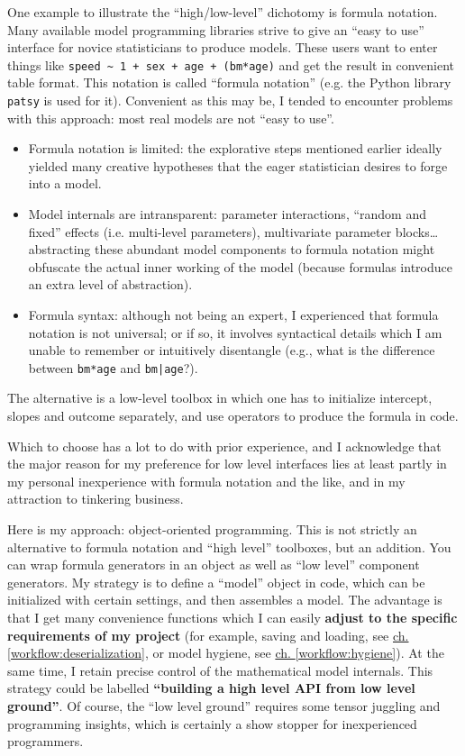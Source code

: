 One example to illustrate the ``high/low-level'' dichotomy is formula notation.
Many available model programming libraries strive to give an ``easy to use'' interface for novice statisticians to produce models.
These users want to enter things like \texttt{speed \textasciitilde{} 1 + sex + age + (bm*age)} and get the result in convenient table format.
This notation is called ``formula notation'' (e.g. the Python library \texttt{patsy} is used for it).
Convenient as this may be, I tended to encounter problems with this approach: most real models are not ``easy to use''.
\begin{itemize}
\item Formula notation is limited: the explorative steps mentioned earlier ideally yielded many creative hypotheses that the eager statistician desires to forge into a model.
\item Model internals are intransparent: parameter interactions, ``random and fixed'' effects (i.e. multi-level parameters), multivariate parameter blocks\ldots{} abstracting these abundant model components to formula notation might obfuscate the actual inner working of the model (because formulas introduce an extra level of abstraction).
\item Formula syntax: although not being an expert, I experienced that formula notation is not universal; or if so, it involves syntactical details which I am unable to remember or intuitively disentangle (e.g., what is the difference between \texttt{bm*age} and \texttt{bm|age}?).
\end{itemize}
The alternative is a low-level toolbox in which one has to initialize intercept, slopes and outcome separately, and use operators to produce the formula in code.

Which to choose has a lot to do with prior experience, and I acknowledge that the major reason for my preference for low level interfaces lies at least partly in my personal inexperience with formula notation and the like, and in my attraction to tinkering business.


Here is my approach: object-oriented programming.
This is not strictly an alternative to formula notation and ``high level'' toolboxes, but an addition.
You can wrap formula generators in an object as well as ``low level'' component generators.
My strategy is to define a ``model'' object in code, which can be initialized with certain settings, and then assembles a model.
The advantage is that I get many convenience functions which I can easily \textbf{adjust to the specific requirements of my project} (for example, saving and loading, see \hyperref[workflow:deserialization]{ch. \ref{workflow:deserialization}}, or model hygiene, see \hyperref[workflow:hygiene]{ch. \ref{workflow:hygiene}}).
At the same time, I retain precise control of the mathematical model internals.
This strategy could be labelled \textbf{``building a high level API from low level ground''}.
Of course, the ``low level ground'' requires some tensor juggling and programming insights, which is certainly a show stopper for inexperienced programmers.

